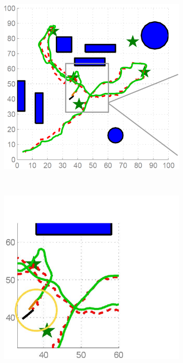 \documentclass[journal]{IEEEtran}
\begin{document}
\begin{figure}
\begin{subfigure}{0.23\textwidth}
			\caption{}
			\label{fig:ref_traj_obs1}
		\end{subfigure}
		~
		\begin{subfigure}{0.23\textwidth}
			\includegraphics[width=1.05\textwidth]{figures/031}
			\caption{}
			\label{fig:ref_traj_obs2}
		\end{subfigure}
		~
		\begin{subfigure}{0.23\textwidth}
			\includegraphics[width=1.05\textwidth]{figures/044}

\end{subfigure}
\end{figure}
\end{document}
